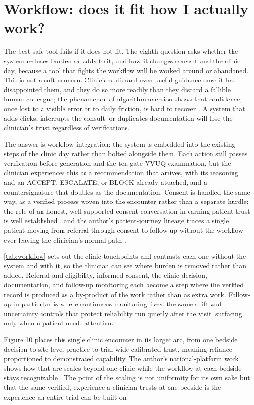 \section{Workflow: does it fit how I actually work?}
\label{sec:workflow}

The best safe tool fails if it does not fit. The eighth question asks whether the
system reduces burden or adds to it, and how it changes consent and the clinic day,
because a tool that fights the workflow will be worked around or abandoned. This is
not a soft concern. Clinicians discard even useful guidance once it has disappointed
them, and they do so more readily than they discard a fallible human colleague; the
phenomenon of algorithm aversion shows that confidence, once lost to a visible
error or to daily friction, is hard to recover \cite{dietvorst2015algorithm}. A
system that adds clicks, interrupts the consult, or duplicates documentation will
lose the clinician's trust regardless of verifications.

The answer is workflow integration: the system is embedded into the existing steps
of the clinic day rather than bolted alongside them. Each action still passes verification before generation and the ten-gate VVUQ examination, but the
clinician experiences this as a recommendation that arrives, with its
reasoning and an ACCEPT, ESCALATE, or BLOCK already attached, and a countersignature
that doubles as the documentation. Consent is handled the same way, as a verified
process woven into the encounter rather than a separate hurdle; the role of an
honest, well-supported consent conversation in earning patient trust is well
established \cite{novak2020patient}, and the author's patient-journey lineage traces
a single patient moving from referral through consent to follow-up without the
workflow ever leaving the clinician's normal path \cite{Kawchak2026CancerPatientsJourney}.

\autoref{tab:workflow} sets out the clinic touchpoints and contrasts each one
without the system and with it, so the clinician can see where burden is removed
rather than added. Referral and eligibility, informed consent, the clinic decision,
documentation, and follow-up monitoring each become a step where the verified record
is produced as a by-product of the work rather than as extra work. Follow-up in
particular is where continuous monitoring lives: the same drift and uncertainty
controls that protect reliability run quietly after the visit, surfacing only when a
patient needs attention.

Figure 10 places this single clinic encounter in its larger arc, from one bedside
decision to site-level practice to trial-wide calibrated trust, meaning reliance
proportioned to demonstrated capability. The author's national-platform work shows
how that arc scales beyond one clinic while the workflow at each bedside stays
recognizable \cite{Kawchak2026NationalPlatformPhysicalAI}. The point of the scaling
is not uniformity for its own sake but that the same verified,
experience a clinician trusts at one bedside is the experience an entire trial can
be built on.

